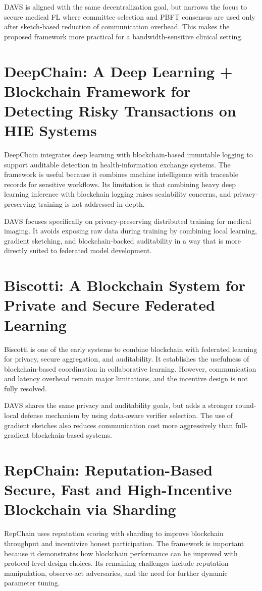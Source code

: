 DAVS is aligned with the same decentralization goal, but narrows the focus to secure medical FL where committee selection and PBFT consensus are used only after sketch-based reduction of communication overhead. This makes the proposed framework more practical for a bandwidth-sensitive clinical setting.

\begingroup
\linespread{0.8}\selectfont
\section{DeepChain: A Deep Learning + Blockchain Framework for Detecting Risky Transactions on HIE Systems}
\endgroup
DeepChain integrates deep learning with blockchain-based immutable logging to support auditable detection in health-information exchange systems. The framework is useful because it combines machine intelligence with traceable records for sensitive workflows. Its limitation is that combining heavy deep learning inference with blockchain logging raises scalability concerns, and privacy-preserving training is not addressed in depth.

DAVS focuses specifically on privacy-preserving distributed training for medical imaging. It avoids exposing raw data during training by combining local learning, gradient sketching, and blockchain-backed auditability in a way that is more directly suited to federated model development.

\begingroup
\linespread{0.8}\selectfont
\section{Biscotti: A Blockchain System for Private and Secure Federated Learning}
\endgroup
Biscotti is one of the early systems to combine blockchain with federated learning for privacy, secure aggregation, and auditability. It establishes the usefulness of blockchain-based coordination in collaborative learning. However, communication and latency overhead remain major limitations, and the incentive design is not fully resolved.

DAVS shares the same privacy and auditability goals, but adds a stronger round-local defense mechanism by using data-aware verifier selection. The use of gradient sketches also reduces communication cost more aggressively than full-gradient blockchain-based systems.

\begingroup
\linespread{0.8}\selectfont
\section{RepChain: Reputation-Based Secure, Fast and High-Incentive Blockchain via Sharding}
\endgroup
RepChain uses reputation scoring with sharding to improve blockchain throughput and incentivize honest participation. The framework is important because it demonstrates how blockchain performance can be improved with protocol-level design choices. Its remaining challenges include reputation manipulation, observe-act adversaries, and the need for further dynamic parameter tuning.

